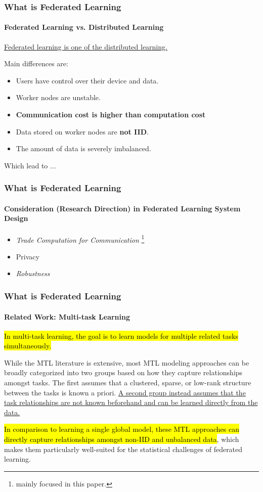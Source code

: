 \documentclass[UTF8,aspectratio=169,presentation]{ctexbeamer}
\makeatletter
\let\HL\hl
\renewcommand\hl{%
  \let\set@color\beamerorig@set@color
  \let\reset@color\beamerorig@reset@color
  \HL}
\makeatother
\begin{document}
\begin{frame}
  \frametitle{What is Federated Learning}
  \framesubtitle{Federated Learning vs. Distributed Learning}
  \begin{center}
    \underline{Federated learning is one of the distributed learning.}
  \end{center}
  \vspace{0.5cm}

Main differences are:
\begin{itemize}
  \item Users have control over their device and data.
  \item Worker nodes are unstable.
  \item \textbf{Communication cost is higher than computation cost}
  \item Data stored on worker nodes are \textbf{not IID}.
  \item The amount of data is severely imbalanced.
\end{itemize}



Which lead to ...

\end{frame}

\begin{frame}
  \frametitle{What is Federated Learning}
  \framesubtitle{Consideration (Research Direction) in Federated Learning System Design}

\begin{itemize}
  \item \textit{Trade Computation for Communication} \footnote{mainly focused in this paper.}
  \item Privacy
  \item \textit{Robustness} \footnotemark[\value{footnote}]
\end{itemize}

\vspace{1cm}


\end{frame}


\begin{frame}[t]
  \frametitle{What is Federated Learning}
  \framesubtitle{Related Work: Multi-task Learning}
  \hl{In multi-task learning, the goal is to learn models for multiple related tasks simultaneously.}

    While the MTL literature is extensive, most MTL modeling approaches can be broadly categorized into two groups based on how they capture relationships amongst tasks. The first assumes that a clustered, sparse, or low-rank structure between the tasks is known a priori. \ul{ A second group instead assumes that the task relationships are not known beforehand and can be learned directly from the data. }

    \hl{In comparison to learning a single global model, these MTL approaches can directly capture relationships amongst non-IID and unbalanced data}, which makes them particularly well-suited for the statistical challenges of federated learning.
  
\end{frame}
\end{document}
